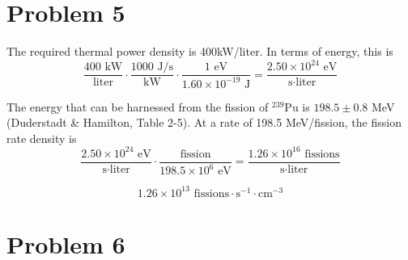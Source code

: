 \documentclass{article}
\begin{document}

\section*{Problem 5}

The required thermal power density is 400kW/liter. In terms of energy, this is 
$$ \frac{400\text{ kW}}{\text{liter}} \cdot \frac{1000 \text{ J/s}}{\text{kW}} \cdot \frac{1 \text{ eV}}{1.60 \times 10^{-19} \text{ J}} = \frac{2.50 \times 10^{24} \text{ eV}}{\text{s} \cdot \text{liter}} $$

The energy that can be harnessed from the fission of $^{239}$Pu is $198.5 \pm 0.8$ MeV (Duderstadt \& Hamilton, Table 2-5). At a rate of 198.5 MeV/fission, the fission rate density is 
$$ \frac{2.50 \times 10^{24} \text{ eV}}{\text{s} \cdot \text{liter}} \cdot \frac{\text{fission}}{198.5 \times 10^6 \text{ eV}} = \frac{1.26 \times 10^{16} \text{ fissions}}{\text{s} \cdot \text{liter}} $$

$$\boxed{ 1.26 \times 10^{13} \text{ fissions} \cdot \text{s}^{-1} \cdot \text{cm}^{-3} }$$




\section*{Problem 6}
\end{document}
